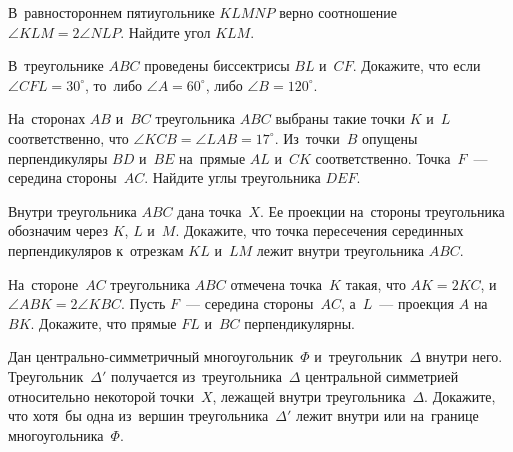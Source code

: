 


\begin{problems}

\item
В~равностороннем пятиугольнике $KLMNP$ верно соотношение
$\angle KLM = 2 \angle NLP$.
Найдите угол $KLM$.

\item
В~треугольнике $ABC$ проведены биссектрисы $BL$ и~$CF$.
Докажите, что если $\angle CFL = 30^{\circ}$, то~либо $\angle A = 60^{\circ}$,
либо $\angle B = 120^{\circ}$.

\item
На~сторонах $AB$ и~$BC$ треугольника $ABC$ выбраны такие точки $K$ и~$L$
соответственно, что $\angle KCB = \angle LAB = 17^{\circ}$.
Из~точки~$B$ опущены перпендикуляры $BD$ и~$BE$ на~прямые $AL$ и~$CK$
соответственно.
Точка~$F$~--- середина стороны~$AC$.
Найдите углы треугольника $DEF$.

\item
Внутри треугольника $ABC$ дана точка~$X$.
Ее проекции на~стороны треугольника обозначим через $K$, $L$ и~$M$.
Докажите, что точка пересечения серединных перпендикуляров
к~отрезкам $KL$ и~$LM$ лежит внутри треугольника $ABC$.

\item
На~стороне~$AC$ треугольника $ABC$ отмечена точка~$K$ такая, что $AK = 2 KC$,
и~$\angle ABK = 2 \angle KBC$.
Пусть $F$~--- середина стороны~$AC$, а~$L$~--- проекция $A$ на~$BK$.
Докажите, что прямые $FL$ и~$BC$ перпендикулярны.

\item
Дан центрально-симметричный многоугольник~$\Phi$ и~треугольник~$\Delta$ внутри
него.
Треугольник~$\Delta'$ получается из~треугольника~$\Delta$ центральной
симметрией относительно некоторой точки~$X$, лежащей внутри
треугольника~$\Delta$.
Докажите, что хотя~бы одна из~вершин треугольника~$\Delta'$ лежит внутри или
на~границе многоугольника~$\Phi$.

\end{problems}

